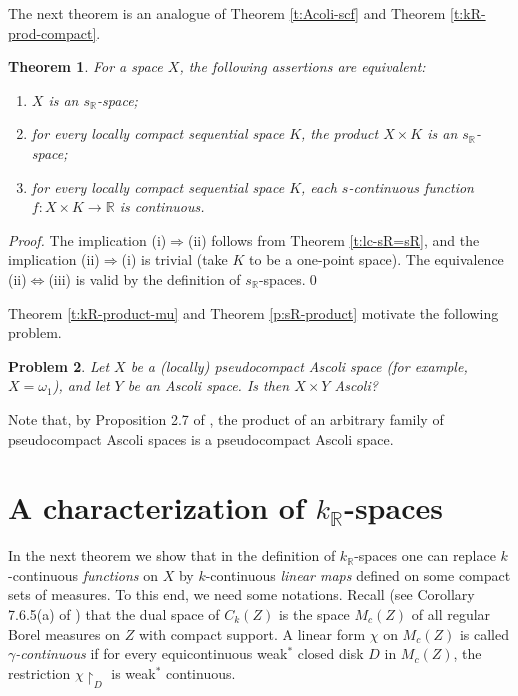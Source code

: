 \documentclass[preprint,11pt]{elsarticle}
\newtheorem{theorem}{Theorem}[section]
\newtheorem{problem}[theorem]{Problem}
\numberwithin{equation}{section}
\numberwithin{theorem}{section}
\newcommand{\IR}{\mathbb{R}}
\newcommand{\Ra}{\Rightarrow}
\newcommand{\LRa}{\Leftrightarrow}
\newcommand{\CC}{C_k}
\begin{document}
The next theorem is an analogue of Theorem \ref{t:Acoli-scf} and Theorem \ref{t:kR-prod-compact}.
\begin{theorem} \label{t:sR-prod-compact}
For a space $X$, the following assertions are equivalent:
\begin{enumerate}
\item[{\rm(i)}] $X$ is an $s_\IR$-space;
\item[{\rm(ii)}] for every locally compact sequential space $K$, the product $X\times K$ is an $s_\IR$-space;
\item[{\rm(iii)}] for every locally compact sequential space $K$,  each $s$-continuous function $f:X\times K\to\IR$ is continuous.
\end{enumerate}
\end{theorem}

\begin{proof}
The implication (i)$\Ra$(ii) follows from Theorem \ref{t:lc-sR=sR}, and the implication (ii)$\Ra$(i) is trivial (take $K$ to be a one-point space). The equivalence (ii)$\LRa$(iii) is valid by the definition of $s_\IR$-spaces.\qed
\end{proof}


Theorem \ref{t:kR-product-mu} and Theorem \ref{p:sR-product}  motivate the following problem.

\begin{problem}
Let $X$ be a (locally) pseudocompact Ascoli space (for example, $X=\omega_1$), and let $Y$ be an Ascoli space. Is then $X\times Y$ Ascoli?
\end{problem}
Note that, by Proposition 2.7 of \cite{Gabr-pseudo-Ascoli}, the product of an arbitrary family of  pseudocompact Ascoli spaces is a pseudocompact Ascoli space.




\section{A characterization of $k_\IR$-spaces} \label{sec:k-R-spaces}



In the next theorem we show that in the definition of $k_\IR$-spaces one can replace $k$-continuous {\em functions} on $X$  by $k$-continuous {\em linear maps} defined on some compact sets of measures.
 To this end, we need some notations.
Recall (see Corollary 7.6.5(a) of \cite{Jar}) that the dual space of $\CC(Z)$ is the space $M_c(Z)$ of all regular Borel measures on $Z$ with compact support.
A  linear form $\chi$ on $M_c(Z)$ is called {\em $\gamma$-continuous} if for every equicontinuous weak$^\ast$  closed disk $D$ in $M_c(Z)$, the restriction $\chi{\restriction}_D$ is weak$^\ast$ continuous.
\end{document}
